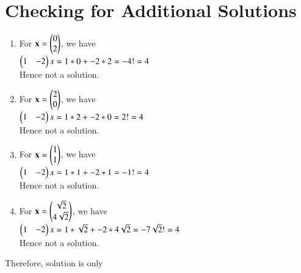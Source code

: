 \documentclass[journal,12pt,twocolumn]{IEEEtran}
\begin{document}
\section{Checking for Additional Solutions}
\begin{enumerate}
  \item For $\mathbf{x} = \begin{pmatrix} 0\\
2
\end{pmatrix}$, we have \\$\begin{pmatrix}1 & -2\end{pmatrix}x = 1*0+-2*2=-4!=4$\\
Hence not a solution. \\
 \item For $\mathbf{x} = \begin{pmatrix} 2\\
0
\end{pmatrix}$, we have \\$\begin{pmatrix}1 & -2\end{pmatrix}x = 1*2+-2*0=2!=4$\\
Hence not a solution.  \\
\item For $\mathbf{x} = \begin{pmatrix} 1\\
1
\end{pmatrix}$, we have \\$\begin{pmatrix}1 & -2\end{pmatrix}x = 1*1+-2*1=-1!=4$\\
Hence not a solution. \\
\item For $\mathbf{x} = \begin{pmatrix} \sqrt{2}\\
4\sqrt{2}
\end{pmatrix}$, we have \\$\begin{pmatrix}1 & -2\end{pmatrix}x = 1*\sqrt{2}+-2*4\sqrt{2}=-7\sqrt{2} !=4$\\
Hence not a solution. 
\end{enumerate}
Therefore, solution is  only 
\end{document}
